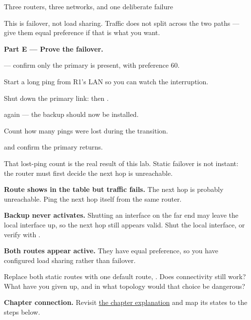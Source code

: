 \begin{labproject}{Three routers, three networks, and one deliberate failure}
\begin{keyidea}
This is failover, not load sharing. Traffic does not split across the two paths --- give them equal preference if that is what you want.
\end{keyidea}

\medskip\noindent\textbf{Part E --- Prove the failover.}\par

\begin{utpsteps}
  \item {} --- confirm only the primary is present, with preference 60.
  \item Start a long ping from R1's LAN so you can watch the interruption.
  \item Shut down the primary link:  then .
  \item {} again --- the backup should now be installed.
  \item Count how many pings were lost during the transition.
  \item {} and confirm the primary returns.
\end{utpsteps}

That lost-ping count is the real result of this lab. Static failover is not instant: the router must first decide the next hop is unreachable.

\begin{troubleshoot}
\textbf{Route shows in the table but traffic fails.} The next hop is probably unreachable. Ping the next hop itself from the same router.

\textbf{Backup never activates.} Shutting an interface on the far end may leave the local interface up, so the next hop still appears valid. Shut the local interface, or verify with .

\textbf{Both routes appear active.} They have equal preference, so you have configured load sharing rather than failover.
\end{troubleshoot}

\begin{tryit}
Replace both static routes with one default route, . Does connectivity still work? What have you given up, and in what topology would that choice be dangerous?
\end{tryit}
\end{labproject}

\textbf{Chapter connection.} Revisit \hyperref[ch:static-routing]{the chapter explanation} and map its states to the steps below.


